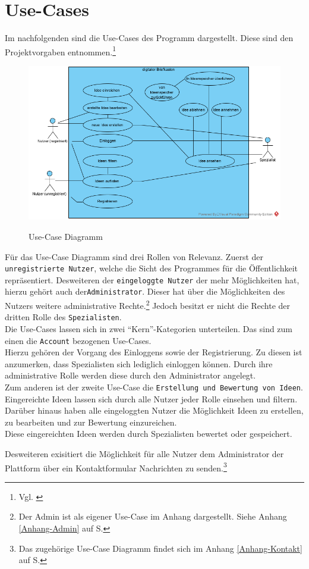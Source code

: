 
\section{Use-Cases}

Im nachfolgenden sind die Use-Cases des Programm dargestellt.
Diese sind den Projektvorgaben entnommen.\footnote{Vgl. \cite{Vorgaben2020}}

\begin{figure}[hbt]\label{Uploadvert}
\centering
\begin{minipage}[t]{1\textwidth} 
\caption{Use-Case Diagramm} 
\includegraphics[width=1\textwidth]{img/createAnAccountWithSpamMailAccountYouSucker.png}\\
\label{fig:Use-Case}
\end{minipage}
\end{figure}

Für das Use-Case Diagramm sind drei Rollen von Relevanz. 
Zuerst der \texttt{unregistrierte Nutzer}, welche die Sicht des Programmes für die Öffentlichkeit repräsentiert.
Desweiteren der \texttt{eingeloggte Nutzer} der mehr Möglichkeiten hat, hierzu gehört auch der\texttt{Administrator}. 
Dieser hat über die Möglichkeiten des Nutzers weitere administrative Rechte.\footnote{Der Admin ist als eigener Use-Case im Anhang dargestellt. Siehe Anhang \ref{Anhang-Admin} auf S.\pageref{Anhang-Admin}}
Jedoch besitzt er nicht die Rechte der dritten Rolle des \texttt{Spezialisten}.\\

Die Use-Cases lassen sich in zwei \enquote{Kern}-Kategorien unterteilen.
Das sind zum einen die \texttt{Account} bezogenen Use-Cases.\\
Hierzu gehören der Vorgang des Einloggens sowie der Registrierung.
Zu diesen ist anzumerken, dass Spezialisten sich lediglich einloggen können. 
Durch ihre administrative Rolle werden diese durch den Administrator angelegt.\\
Zum anderen ist der zweite Use-Case die \texttt{Erstellung und Bewertung von Ideen}.\\
Eingereichte Ideen lassen sich durch alle Nutzer jeder Rolle einsehen und filtern. Darüber hinaus haben alle eingeloggten Nutzer die Möglichkeit Ideen zu erstellen, zu bearbeiten und zur Bewertung einzureichen.\\
Diese eingereichten Ideen werden durch Spezialisten bewertet oder gespeichert.

Desweiteren exisitiert die Möglichkeit für alle Nutzer dem Administrator der Plattform über ein Kontaktformular Nachrichten zu senden.\footnote{Das zugehörige Use-Case Diagramm findet sich im Anhang \ref{Anhang-Kontakt} auf S.\pageref{Anhang-Kontakt}}